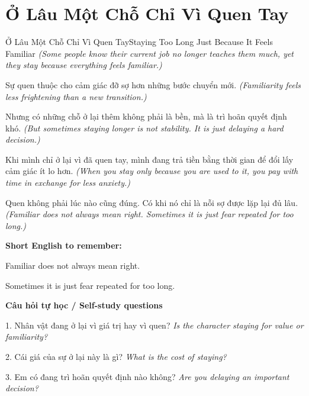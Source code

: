 \section{Ở Lâu Một Chỗ Chỉ Vì Quen Tay}
\begin{truyen}{Ở Lâu Một Chỗ Chỉ Vì Quen Tay}{Staying Too Long Just Because It Feels Familiar}
\textit{(Some people know their current job no longer teaches them much, yet they stay because everything feels familiar.)}

Sự quen thuộc cho cảm giác đỡ sợ hơn những bước chuyển mới.
\textit{(Familiarity feels less frightening than a new transition.)}

Nhưng có những chỗ ở lại thêm không phải là bền, mà là trì hoãn quyết định khó.
\textit{(But sometimes staying longer is not stability. It is just delaying a hard decision.)}

Khi mình chỉ ở lại vì đã quen tay, mình đang trả tiền bằng thời gian để đổi lấy cảm giác ít lo hơn.
\textit{(When you stay only because you are used to it, you pay with time in exchange for less anxiety.)}

\end{truyen}

\begin{baihoc}
Quen không phải lúc nào cũng đúng. Có khi nó chỉ là nỗi sợ được lặp lại đủ lâu.
\textit{(Familiar does not always mean right. Sometimes it is just fear repeated for too long.)}
\end{baihoc}

\begin{ghinhoanh}
\textbf{Short English to remember:}

Familiar does not always mean right.

Sometimes it is just fear repeated for too long.

\end{ghinhoanh}

\begin{tuhocnhanh}
\textbf{Câu hỏi tự học / Self-study questions}

1. Nhân vật đang ở lại vì giá trị hay vì quen? \textit{Is the character staying for value or familiarity?}

2. Cái giá của sự ở lại này là gì? \textit{What is the cost of staying?}

3. Em có đang trì hoãn quyết định nào không? \textit{Are you delaying an important decision?}
\end{tuhocnhanh}
\ngancach

